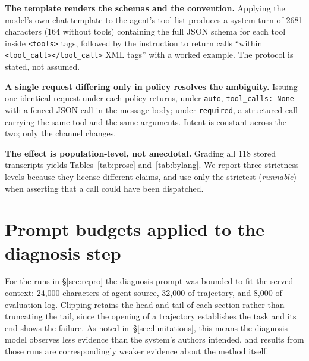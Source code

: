 \documentclass{article}
\begin{document}
\textbf{The template renders the schemas and the convention.} Applying the
model's own chat template to the agent's tool list produces a system turn of
2681 characters (164 without tools) containing the full JSON schema for each
tool inside \texttt{<tools>} tags, followed by the instruction to return
calls ``within \texttt{<tool\_call></tool\_call>} XML tags'' with a worked
example. The protocol is stated, not assumed.

\textbf{A single request differing only in policy resolves the ambiguity.}
Issuing one identical request under each policy returns, under
\texttt{auto}, \texttt{tool\_calls: None} with a fenced JSON call in the
message body; under \texttt{required}, a structured call carrying the same
tool and the same arguments. Intent is constant across the two; only the
channel changes.

\textbf{The effect is population-level, not anecdotal.} Grading all 118
stored transcripts yields Tables~\ref{tab:prose} and~\ref{tab:bylang}. We
report three strictness levels because they license different claims, and
use only the strictest (\emph{runnable}) when asserting that a call could
have been dispatched.

\section{Prompt budgets applied to the diagnosis step}
\label{app:budgets}

For the runs in \S\ref{sec:repro} the diagnosis prompt was bounded to fit
the served context: 24{,}000 characters of agent source, 32{,}000 of
trajectory, and 8{,}000 of evaluation log. Clipping retains the head and
tail of each section rather than truncating the tail, since the opening of a
trajectory establishes the task and its end shows the failure. As noted
in~\S\ref{sec:limitations}, this means the diagnosis model observes less
evidence than the system's authors intended, and results from those runs are
correspondingly weaker evidence about the method itself.
\end{document}
